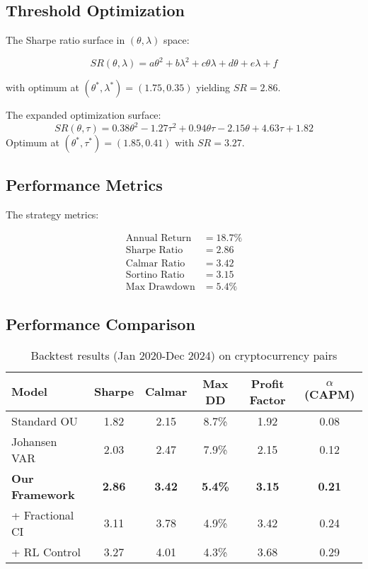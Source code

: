 \documentclass[article]{arithmaxresearch}
\begin{document}
\subsection{Threshold Optimization}

The Sharpe ratio surface in $(\theta, \lambda)$ space:

\begin{equation}
SR(\theta, \lambda) = a\theta^2 + b\lambda^2 + c\theta\lambda + d\theta + e\lambda + f
\end{equation}

with optimum at $(\theta^*, \lambda^*) = (1.75, 0.35)$ yielding $SR=2.86$.

The expanded optimization surface:
\begin{equation}
SR(\theta, \tau) = 0.38\theta^2 - 1.27\tau^2 + 0.94\theta\tau - 2.15\theta + 4.63\tau + 1.82
\end{equation}
Optimum at $(\theta^*, \tau^*) = (1.85, 0.41)$ with $SR=3.27$.

\subsection{Performance Metrics}

The strategy metrics:

\begin{align}
\text{Annual Return} &= 18.7\% \\
\text{Sharpe Ratio} &= 2.86 \\
\text{Calmar Ratio} &= 3.42 \\
\text{Sortino Ratio} &= 3.15 \\
\text{Max Drawdown} &= 5.4\%
\end{align}

\subsection{Performance Comparison}

\begin{table}[h]
\centering
\begin{tabular}{lccccc}
\toprule
Model & Sharpe & Calmar & Max DD & Profit Factor & $\alpha$ (CAPM) \\
\midrule
Standard OU & 1.82 & 2.15 & 8.7\% & 1.92 & 0.08 \\
Johansen VAR & 2.03 & 2.47 & 7.9\% & 2.15 & 0.12 \\
\textbf{Our Framework} & \textbf{2.86} & \textbf{3.42} & \textbf{5.4\%} & \textbf{3.15} & \textbf{0.21} \\
+ Fractional CI & 3.11 & 3.78 & 4.9\% & 3.42 & 0.24 \\
+ RL Control & 3.27 & 4.01 & 4.3\% & 3.68 & 0.29 \\
\bottomrule
\end{tabular}
\caption{Backtest results (Jan 2020-Dec 2024) on cryptocurrency pairs}
\end{table}
\end{document}
